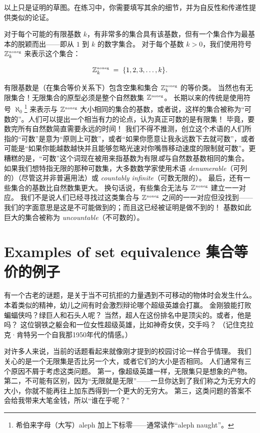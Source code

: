 以上只是证明的草图。在练习中，你需要填写其余的细节，并为自反性和传递性提供类似的论证。

对于每个可能的有限基数 $k$，有非常多的集合具有该基数，但有一个集合作为最基本的脱颖而出——即从 $1$ 到 $k$ 的数字集合。
对于每个基数 $k > 0$，我们使用符号 ${\mathbb Z}^{\mbox{\tiny noneg}}_k$ 来表示这个集合：

\[ {\mathbb Z}^{\mbox{\tiny noneg}}_k \; = \;
    \{1, 2, 3, \ldots , k\}. \]

有限基数是（在集合等价关系下）包含空集和集合 ${\mathbb Z}^{\mbox{\tiny noneg}}_k$ 的等价类。
当然也有无限集合！无限集合的原型必须是整个自然数集 ${\mathbb Z}^{\mbox{\tiny noneg}}$。
长期以来的传统是使用符号  $\aleph_0$\footnote{希伯来字母（大写）aleph 加上下标零——通常读作“aleph naught”。} 来表示与 ${\mathbb Z}^{\mbox{\tiny noneg}}$ 大小相同的集合的基数，或者说，这样的集合被称为“可数的”。人们可以提出一个相当有力的论点，认为真正可数的是有限集！
毕竟，要数完所有自然数简直需要永远的时间！
我们不得不推测，创立这个术语的人们所指的“可数”是意为“原则上可数”，或者“如果你愿意让我永远数下去就可数”，或者可能是“如果你能越数越快并且能够忽略光速对你嘴唇移动速度的限制就可数”。更糟糕的是，“可数”这个词现在被用来指基数为有限\emph{或}与自然数基数相同的集合。
如果我们想特指无限的那种可数集，大多数数学家使用术语 \emph{denumerable}（可列的）（尽管这并非普遍用法）或  \emph{countably infinite}（可数无限的）。
最后，还有一些集合的基数比自然数集更大。
换句话说，有些集合无法与 ${\mathbb Z}^{\mbox{\tiny noneg}}$ 建立一一对应。
我们不是说人们已经寻找过这类集合与 ${\mathbb Z}^{\mbox{\tiny noneg}}$ 之间的一一对应但没找到——我们的字面意思是这是不可能做到的；而且这已经被证明是做不到的！
基数如此巨大的集合被称为  \emph{uncountable}（不可数的）。

\clearpage




\newpage

\section{Examples of set equivalence 集合等价的例子}
\label{sec:examp_set_eq}

有一个古老的谜题，是关于当不可抗拒的力量遇到不可移动的物体时会发生什么。
本着类似的精神，幼儿之间有时会激烈辩论哪个超级英雄会打赢。
金刚狼能打败蝙蝠侠吗？绿巨人和石头人呢？
当然，超人在这份排名中是顶尖的。或者，他是吗？
这位钢铁之躯会和一位女性超级英雄，比如神奇女侠，交手吗？
（记住克拉克·肯特另一个自我那1950年代的情感。）

对许多人来说，当前的话题看起来就像刚才提到的校园讨论一样合乎情理。
我们关心的是一个无限集是否比另一个大，或者它们的大小是否相同。
人们通常有三个原因不屑于考虑这类问题。
第一，像超级英雄一样，无限集只是想象的产物。
第二，不可能有区别，因为“无限就是无限”——一旦你达到了我们称之为无穷大的大小，你就不能再往上加东西得到一个更大的无穷大。
第三，这类问题的答案不会给我带来大笔金钱，所以“谁在乎呢？”


